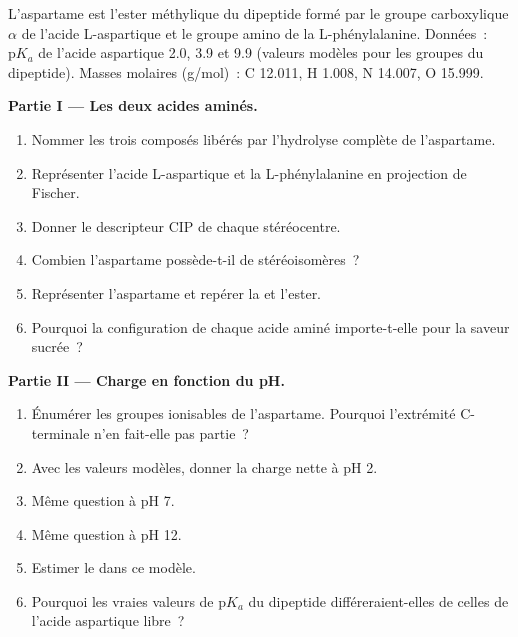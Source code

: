 \begin{problem}
\label{pb:b2:biomolecules:1}
L'aspartame est l'ester méthylique du dipeptide formé par le groupe carboxylique $\alpha$ de l'acide
L-aspartique et le groupe amino de la L-phénylalanine. Données~: $\mathrm pK_a$ de l'acide aspartique 2.0,
3.9 et 9.9 (valeurs modèles pour les groupes du dipeptide). Masses molaires (\unit{g/mol})~: C 12.011,
H 1.008, N 14.007, O 15.999.

\medskip
\noindent\textbf{Partie I --- Les deux acides aminés.}
\begin{enumerate}
  \item Nommer les trois composés libérés par l'hydrolyse complète de l'aspartame.
  \item Représenter l'acide L-aspartique et la L-phénylalanine en projection de Fischer.
  \item Donner le descripteur CIP de chaque stéréocentre.
  \item Combien l'aspartame possède-t-il de stéréoisomères~?
  \item Représenter l'aspartame et repérer la  et l'ester.
  \item Pourquoi la configuration de chaque acide aminé importe-t-elle pour la saveur sucrée~?
\end{enumerate}

\medskip
\noindent\textbf{Partie II --- Charge en fonction du pH.}
\begin{enumerate}[resume]
  \item Énumérer les groupes ionisables de l'aspartame. Pourquoi l'extrémité C-terminale n'en fait-elle pas partie~?
  \item Avec les valeurs modèles, donner la charge nette à pH 2.
  \item Même question à pH 7.
  \item Même question à pH 12.
  \item Estimer le  dans ce modèle.
  \item Pourquoi les vraies valeurs de $\mathrm pK_a$ du dipeptide différeraient-elles de celles de l'acide
        aspartique libre~?
\end{enumerate}


\end{problem}
